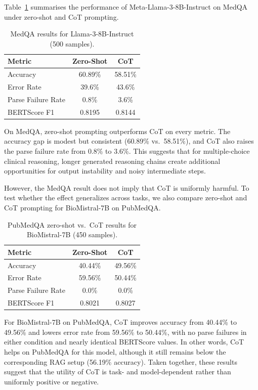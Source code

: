 \documentclass[11pt]{article}
\begin{document}
Table~\ref{tab:medqa-llama} summarises the performance of 
Meta-Llama-3-8B-Instruct on MedQA under zero-shot and CoT prompting.

\begin{table}[h]
  \centering
  \begin{tabular}{lcc}
    \toprule
    \textbf{Metric} & \textbf{Zero-Shot} & \textbf{CoT} \\
    \midrule
    Accuracy           & 60.89\%   & 58.51\%  \\
    Error Rate         & 39.6\%    & 43.6\%   \\
    Parse Failure Rate & 0.8\%     & 3.6\%    \\
    BERTScore F1       & 0.8195    & 0.8144   \\
    \bottomrule
  \end{tabular}
  \caption{MedQA results for Llama-3-8B-Instruct (500 samples).}
  \label{tab:medqa-llama}
\end{table}

On MedQA, zero-shot prompting outperforms CoT on every metric. The 
accuracy gap is modest but consistent (60.89\% vs.\ 58.51\%), and CoT 
also raises the parse failure rate from 0.8\% to 3.6\%. This suggests 
that for multiple-choice clinical reasoning, longer generated reasoning 
chains create additional opportunities for output instability and noisy 
intermediate steps.

However, the MedQA result does not imply that CoT is uniformly harmful. 
To test whether the effect generalizes across tasks, we also compare 
zero-shot and CoT prompting for BioMistral-7B on PubMedQA.

\begin{table}[h]
  \centering
  \begin{tabular}{lcc}
    \toprule
    \textbf{Metric} & \textbf{Zero-Shot} & \textbf{CoT} \\
    \midrule
    Accuracy           & 40.44\%   & 49.56\%  \\
    Error Rate         & 59.56\%   & 50.44\%  \\
    Parse Failure Rate & 0.0\%     & 0.0\%    \\
    BERTScore F1       & 0.8021    & 0.8027   \\
    \bottomrule
  \end{tabular}
  \caption{PubMedQA zero-shot vs.\ CoT results for BioMistral-7B (450 samples).}
  \label{tab:pubmedqa-biomistral-cot}
\end{table}

For BioMistral-7B on PubMedQA, CoT improves accuracy from 40.44\% to 
49.56\% and lowers error rate from 59.56\% to 50.44\%, with no parse 
failures in either condition and nearly identical BERTScore values. In 
other words, CoT helps on PubMedQA for this model, although it still 
remains below the corresponding RAG setup (56.19\% accuracy). Taken 
together, these results suggest that the utility of CoT is task- and 
model-dependent rather than uniformly positive or negative.
\end{document}
